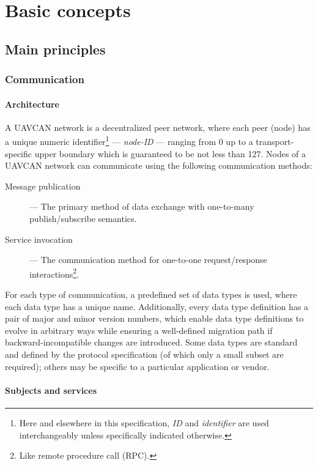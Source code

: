 \chapter{Basic concepts}\label{sec:basic}

\section{Main principles}

\subsection{Communication}

\subsubsection{Architecture}

A UAVCAN network is a decentralized peer network, where each peer (node) has a unique
numeric identifier\footnote{Here and elsewhere in this specification, \emph{ID} and \emph{identifier} are used
interchangeably unless specifically indicated otherwise.}
--- \emph{node-ID} --- ranging from 0 up to a transport-specific upper boundary which is guaranteed to be
not less than 127.
Nodes of a UAVCAN network can communicate using the following communication methods:

\begin{description}
    \item[Message publication] --- The primary method of data exchange with one-to-many publish/subscribe semantics.
    \item[Service invocation] --- The communication method for one-to-one request/response
    interactions\footnote{Like remote procedure call (RPC).}.
\end{description}

For each type of communication, a predefined set of data types is used,
where each data type has a unique name.
Additionally, every data type definition has a pair of major and minor version numbers,
which enable data type definitions to evolve in arbitrary ways while ensuring a well-defined
migration path if backward-incompatible changes are introduced.
Some data types are standard and defined by the protocol specification (of which only a small
subset are required); others may be specific to a particular application or vendor.

\subsubsection{Subjects and services}\label{sec:basic_subjects_and_services}

